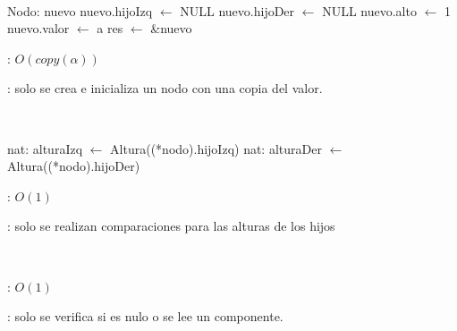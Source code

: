 \begin{Algoritmos}
	~

	\begin{algorithm}[H]
		\NoCaptionOfAlgo
		\caption{}
		\BlankLine
		Nodo: nuevo
		nuevo.hijoIzq $\leftarrow$ NULL
		nuevo.hijoDer $\leftarrow$ NULL
		nuevo.alto $\leftarrow$ 1
		nuevo.valor $\leftarrow$ a
		res $\leftarrow$ \&nuevo
	\end{algorithm}
	
	\complejidad: $O(copy(\alpha))$

	\justifcomp: solo se crea e inicializa un nodo con una copia del valor.

	~

	\begin{algorithm}[H]
		\NoCaptionOfAlgo
		\caption{}
		\BlankLine
		nat: alturaIzq $\leftarrow$ Altura((*nodo).hijoIzq)
		nat: alturaDer $\leftarrow$ Altura((*nodo).hijoDer)
	\end{algorithm}
	
	\complejidad: $O(1)$

	\justifcomp: solo se realizan comparaciones para las alturas de los hijos

	~

	\begin{algorithm}[H]
		\NoCaptionOfAlgo
		\caption{}
		\BlankLine
	\end{algorithm}
	
	\complejidad: $O(1)$

	\justifcomp: solo se verifica si es nulo o se lee un componente.

	~


\end{Algoritmos}
